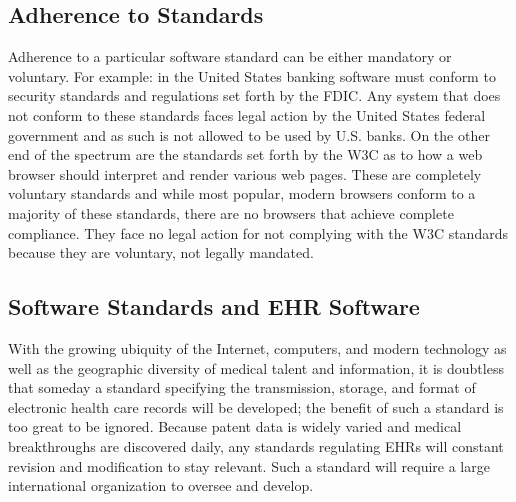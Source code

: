 \documentclass[14pt]{article}
\begin{document}
\subsection{Adherence to Standards}
Adherence to a particular software standard can be either mandatory or voluntary. For example: in the United States banking software must conform to security standards and regulations set forth by the \gls{FDIC}. Any system that does not conform to these standards faces legal action by the United States federal government and as such is not allowed to be used by U.S. banks. On the other end of the spectrum are the standards set forth by the \gls{W3C} as to how a web browser should interpret and render various web pages. These are completely voluntary standards and while most popular, modern browsers conform to a majority of these standards, there are no browsers that achieve complete compliance. They face no legal action for not complying with the \gls{W3C} standards because they are voluntary, not legally mandated.

\subsection{Software Standards and EHR Software}
With the growing ubiquity of the Internet, computers, and modern technology as well as the geographic diversity of medical talent and information, it is doubtless that someday a standard specifying the transmission, storage, and format of electronic health care records will be developed; the benefit of such a standard is too great to be ignored. Because patent data is widely varied and medical breakthroughs are discovered daily, any standards regulating \glspl{EHR} will constant revision and modification to stay relevant. Such a standard will require a large international organization to oversee and develop.



\end{document}
